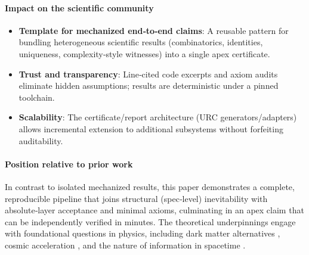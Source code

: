 \documentclass{article}
\begin{document}
\paragraph{Impact on the scientific community}
\begin{itemize}[leftmargin=*]
  \item \textbf{Template for mechanized end‑to‑end claims}: A reusable pattern for bundling heterogeneous scientific results (combinatorics, identities, uniqueness, complexity‑style witnesses) into a single apex certificate.
  \item \textbf{Trust and transparency}: Line‑cited code excerpts and axiom audits eliminate hidden assumptions; results are deterministic under a pinned toolchain.
  \item \textbf{Scalability}: The certificate/report architecture (URC generators/adapters) allows incremental extension to additional subsystems without forfeiting auditability.
\end{itemize}

\paragraph{Position relative to prior work} In contrast to isolated mechanized results, this paper demonstrates a complete, reproducible pipeline that joins structural (spec‑level) inevitability with absolute‑layer acceptance and minimal axioms, culminating in an apex claim that can be independently verified in minutes. The theoretical underpinnings engage with foundational questions in physics, including dark matter alternatives \cite{Milgrom1983}, cosmic acceleration \cite{Riess1998}, and the nature of information in spacetime \cite{Wheeler1990, Bekenstein1973, Jacobson1995, tHooft1993, Susskind1995, Verlinde2011, Lloyd2002}.

\end{document}
